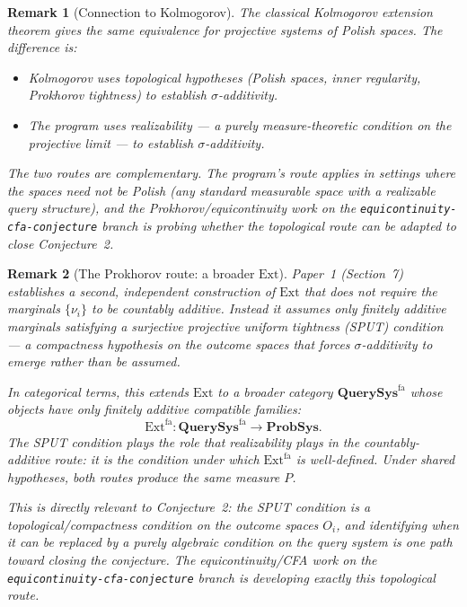 \documentclass[11pt]{article}
\newtheorem{remark}{Remark}
\newcommand{\QSys}{\mathbf{QuerySys}}
\newcommand{\PSys}{\mathbf{ProbSys}}
\newcommand{\Ext}{\mathrm{Ext}}
\begin{document}
\begin{remark}[Connection to Kolmogorov]
The classical Kolmogorov extension theorem gives the same equivalence for
projective systems of Polish spaces.  The difference is:
\begin{itemize}
  \item Kolmogorov uses \emph{topological} hypotheses (Polish spaces,
    inner regularity, Prokhorov tightness) to establish $\sigma$-additivity.
  \item The program uses \emph{realizability} --- a purely measure-theoretic
    condition on the projective limit --- to establish $\sigma$-additivity.
\end{itemize}
The two routes are complementary.  The program's route applies in settings
where the spaces need not be Polish (any standard measurable space with a
realizable query structure), and the Prokhorov/equicontinuity work on the
\texttt{equicontinuity-cfa-conjecture} branch is probing whether the
topological route can be adapted to close Conjecture~2.
\end{remark}

\begin{remark}[The Prokhorov route: a broader $\Ext$]
Paper~1 (Section~7) establishes a second, independent construction of $\Ext$
that does not require the marginals $\{\nu_i\}$ to be countably additive.
Instead it assumes only \emph{finitely additive} marginals satisfying a
\emph{surjective projective uniform tightness} (SPUT) condition --- a
compactness hypothesis on the outcome spaces that forces $\sigma$-additivity
to emerge rather than be assumed.

In categorical terms, this extends $\Ext$ to a broader category
$\QSys^{\mathrm{fa}}$ whose objects have only finitely additive compatible
families:
\[
  \Ext^{\mathrm{fa}} : \QSys^{\mathrm{fa}} \to \PSys.
\]
The SPUT condition plays the role that realizability plays in the
countably-additive route: it is the condition under which $\Ext^{\mathrm{fa}}$
is well-defined.  Under shared hypotheses, both routes produce the same
measure $P$.

This is directly relevant to Conjecture~2: the SPUT condition is a
topological/compactness condition on the outcome spaces $O_i$, and
identifying when it can be replaced by a purely algebraic condition on
the query system is one path toward closing the conjecture.  The
equicontinuity/CFA work on the \texttt{equicontinuity-cfa-conjecture}
branch is developing exactly this topological route.
\end{remark}
\end{document}
